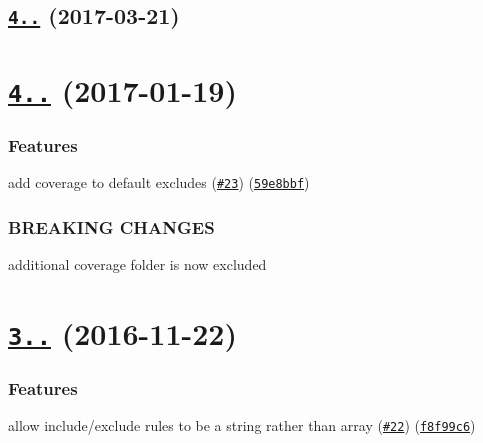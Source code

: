  \subsection*{\href{https://github.com/istanbuljs/test-exclude/compare/test-exclude@4.0.0...test-exclude@4.0.2}{\tt 4..} (2017-\/03-\/21)}

\label{_4.0.0}%
 \section*{\href{https://github.com/istanbuljs/test-exclude/compare/v3.3.0...v4.0.0}{\tt 4..} (2017-\/01-\/19)}

\subsubsection*{Features}


\begin{DoxyItemize}
\item add coverage to default excludes (\href{https://github.com/istanbuljs/test-exclude/issues/23}{\tt \#23}) (\href{https://github.com/istanbuljs/test-exclude/commit/59e8bbf}{\tt 59e8bbf})
\end{DoxyItemize}

\subsubsection*{B\+R\+E\+A\+K\+I\+NG C\+H\+A\+N\+G\+ES}


\begin{DoxyItemize}
\item additional coverage folder is now excluded
\end{DoxyItemize}

\label{_3.3.0}%
 \section*{\href{https://github.com/istanbuljs/test-exclude/compare/v3.2.2...v3.3.0}{\tt 3..} (2016-\/11-\/22)}

\subsubsection*{Features}


\begin{DoxyItemize}
\item allow include/exclude rules to be a string rather than array (\href{https://github.com/istanbuljs/test-exclude/issues/22}{\tt \#22}) (\href{https://github.com/istanbuljs/test-exclude/commit/f8f99c6}{\tt f8f99c6})
\end{DoxyItemize}

